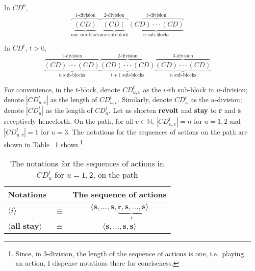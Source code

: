 \documentclass[12pt,letter]{article}
\theoremstyle{definition}
\theoremstyle{remark}
\theoremstyle{claim}
\begin{document}
In $CD^0$, 
\[\overbrace{\underbrace{( CD) }_{\text{one sub-block}}}^{\text{$1$-division}} \overbrace{\underbrace{(CD) }_{\text{one sub-block}}}^{\text{$2$-division}} \overbrace{\underbrace{(CD) \cdot \cdot \cdot (CD)}_{\text{$n$ sub-blocks}}}^{\text{$3$-division}}\] 

In $CD^t$, $t>0$,
\[\overbrace{\underbrace{(CD) \cdot \cdot \cdot (CD)}_{\text{$n$ sub-blocks}}}^{\text{$1$-division}} \overbrace{\underbrace{(CD) \cdot \cdot \cdot (CD)}_{\text{$t+1$ sub-blocks}} }^{\text{$2$-division}} \overbrace{\underbrace{(CD) \cdot \cdot \cdot (CD)}_{\text{$n$ sub-blocks}}}^{\text{$3$-division}}\] 




For convenience, in the $t$-block, denote $CD^t_{u,v}$ as the $v$-th sub-block in $u$-division; denote $|CD^t_{u,v} |$ as the length of $CD^t_{u,v}$. Similarly, denote $CD^t_{u}$ as the $u$-division; denote $|CD^t_{u} |$ as the length of $CD^t_{u}$. Let us shorten \textbf{revolt} and \textbf{stay} to \textbf{r} and \textbf{s} receptively henceforth. On the path, for all $v\in \mathbb{N}$, $|CD^t_{u,v}|=n$ for $u=1,2$ and $|CD^t_{u,v}|=1$ for $u=3$. The notations for the sequences of actions on the path are shown in Table ~\ref{Table_msg_coordination} shows.\footnote{Since, in $3$-division, the length of the sequence of actions is one, i.e.~playing an action, I dispense notations there for conciseness.}

\begin{table}[!htbp]
\caption{The notations for the sequences of actions in $CD^t_{u}$ for $u=1,2$, on the path}
\label{Table_msg_coordination}
\begin{center}
\begin{tabular}{l c c}
Notations & &The sequence of actions \\
\hline
\hline
$\langle i \rangle$ 				& $\equiv$ 			& $\langle \textbf{s},...,\textbf{s},\underbrace{\textbf{r},\textbf{s},...,\textbf{s}}_{i} \rangle$  \\
$\langle \textbf{all stay} \rangle$	 					& $\equiv$ 			& $\langle \textbf{s},...,\textbf{s},{\textbf{s}}\rangle$  \\
\hline
\end{tabular}
\end{center}
\end{table}
\end{document}
